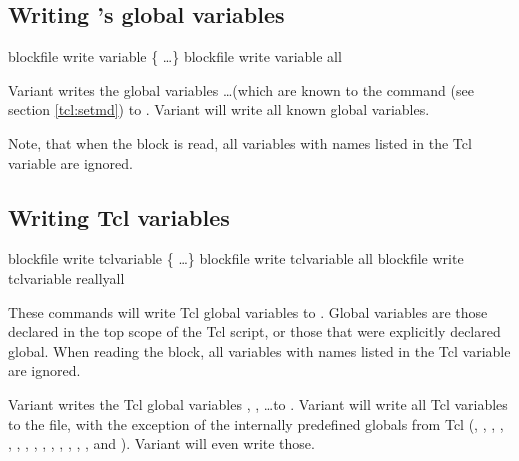 \subsection{Writing \es's global variables}

\begin{essyntax}
   blockfile  
  write variable \{  \dots \}
   blockfile  write variable all
\end{essyntax}

Variant  writes the global variables 
 \dots (which are known to the  command (see
section \vref{tcl:setmd}) to . Variant  will
write all known global variables.

Note, that when the block is read, all variables with names listed in
the Tcl variable  are ignored.

\subsection{Writing Tcl variables}

\begin{essyntax}
   blockfile  write tclvariable \{
    \dots \}
   blockfile  write tclvariable all
   blockfile  write tclvariable reallyall
\end{essyntax}

These commands will write Tcl global variables to .
Global variables are those declared in the top scope of the Tcl
script, or those that were explicitly declared global.  When reading
the block, all variables with names listed in the Tcl variable
 are ignored.

Variant  writes the Tcl global variables ,
, \dots to . Variant  will write
all Tcl variables to the file, with the exception of the internally
predefined globals from Tcl (, ,
, , , ,
, , , ,
, , , ,
 and ). Variant  will
even write those.


